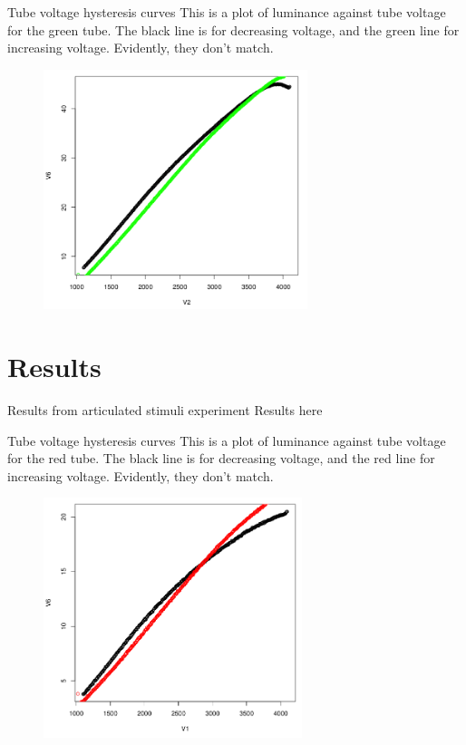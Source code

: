 \documentclass{beamer}
\begin{document}
\begin{frame}[t]{Tube voltage hysteresis curves}
This is a plot of luminance against tube voltage for the green tube. The black line is for decreasing voltage, and the green line for increasing voltage. Evidently, they don't match.
\begin{figure}[c]
\includegraphics[height=7cm]{greenhysteresis.png}
\end{figure}
\end{frame}


\section{Results}
\begin{frame}[t]{Results from articulated stimuli experiment}
Results here
\end{frame}

\begin{frame}[t]{Tube voltage hysteresis curves}
This is a plot of luminance against tube voltage for the red tube. The black line is for decreasing voltage, and the red line for increasing voltage. Evidently, they don't match.
\begin{figure}[c]
\includegraphics[height=7cm]{redhysteresis.png}
\end{figure}
\end{frame}
\end{document}
